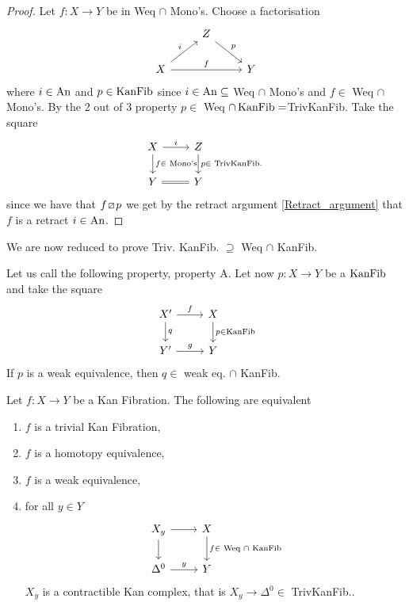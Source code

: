 \begin{proof}
    Let $f\colon X \to Y $ be in Weq $\cap$ Mono's.
    Choose a factorisation 
    \[
    \begin{tikzcd}
        &
        Z
        \ar[rd, "p"]
        &
        \\
        X
        \ar[ru, "i"]
        \ar[rr, "f"]
        &&
        Y
    \end{tikzcd}
    \]
    where $i \in \operatorname{An}$ and $p \in \operatorname{KanFib}$ since $i \in \operatorname{An} \subseteq$ Weq $\cap$ Mono's and $f\in$ Weq $\cap$ Mono's.
    By the 2 out of 3 property $p \in$ Weq $\cap \operatorname{KanFib} = $TrivKanFib.
    Take the square 
    \[
    \begin{tikzcd}
        X
        \ar[r, "i"]
        \ar[d, "f \in \text{ Mono's}"]
        &
        Z
        \ar[d,"p \in \text{ TrivKanFib. }"]
        \\
        Y 
        \ar[r, equal]
        &
        Y
    \end{tikzcd}
    \]
    since we have that $f \lift{} p$ we get by the retract argument \cref{Retract_argument} that $f$ is a retract $i \in \operatorname{An}$.
\end{proof}

We are now reduced to prove Triv. KanFib. $\supseteq$ Weq $\cap$ KanFib.

\begin{prop}
\label{Property A}
Let us call the following property, property A.
Let now $p \colon X \to Y$ be a $\operatorname{KanFib}$ and take the square
\[
\begin{tikzcd}
    X'
    \ar[d, "q"]
    \ar[r, "f"]
    &
    X
    \ar[d, "p \in \KanFib"]
    \\
    Y'
    \ar[r, "g"]
    &
    Y
\end{tikzcd}
\]
If $p$ is a weak equivalence, then $q \in$ weak eq. $\cap$ KanFib. 
\end{prop}

\begin{thm}
\label{Ex_infinity properties}
    Let $f\colon X \to Y$ be a Kan Fibration.
    The following are equivalent
    \begin{enumerate}
        \item 
        $f$ is a trivial Kan Fibration,
        \item 
        $f$ is a homotopy equivalence,
        \item 
        $f$ is a weak equivalence,
        \item 
        for all $y \in Y$
        \[
        \begin{tikzcd}
            X_y
            \ar[r]
            \dar
            &
            X
            \dar["f \in \text{ Weq $\cap$ KanFib}"]
            \\
            \Delta^0
            \rar["y"]
            &
            Y
        \end{tikzcd}
        \]
        $X_y$ is a contractible Kan complex, that is $X_y \to \Delta^0 \in$ TrivKanFib..
    \end{enumerate}
\end{thm}

